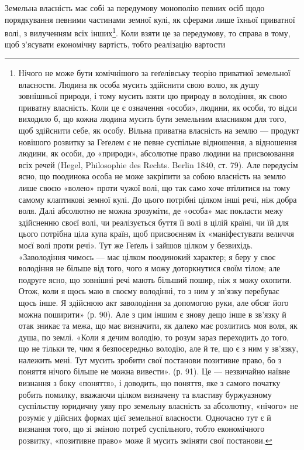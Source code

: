 Земельна власність має собі за передумову монополію певних осіб щодо
порядкування певними частинами земної кулі, як сферами лише їхньої приватної
волі, з вилученням всіх інших\footnote{
Нічого не може бути комічнішого за геґелівську теорію приватної земельної власности. Людина
як особа мусить здійснити свою волю, як душу зовнішньої природи, і тому мусить взяти цю
природу в володіння, як свою приватну власність. Коли це є означення «особи», людини, як особи,
то відси виходило б, що кожна людина мусить бути земельним власником для того, щоб здійснити себе,
як особу. Вільна приватна власність на землю — продукт новішого розвитку за Геґелем є не певне
суспільне відношення, а відношення людини, як особи, до «природи», абсолютне право людини на
присвоювання
всіх речей (Hegel, Philosophie des Rechts. Berlin 1840, ст. 79). Але передусім ясно, що поодинока
особа не може закріпити за собою власність на землю лише своєю «волею» проти чужої волі, що
так само хоче втілитися на тому самому клаптикові земної кулі. До цього потрібні цілком інші речі,
ніж добра воля. Далі абсолютно не можна зрозуміти, де «особа» має покласти межу здійсненню своєї
волі, чи реалізується буття її волі в цілій країні, чи їй для цього потрібна ціла купа країн, щоб
присвоєнням
їх «маніфестувати величчя моєї волі проти речі». Тут же Геґель і зайшов цілком у безвихідь.
«Заволодіння чимось — має цілком поодинокий характер; я беру у своє володіння не більше від того,
чого
я можу доторкнутися своїм тілом; але подруге ясно, що зовнішні речі мають більший пошир, ніж
я можу охопити. Отож, коли я щось маю в своєму володінні, то з ним у зв’язку перебуває щось інше.
Я здійснюю акт заволодіння за допомогою руки, але обсяг його можна поширити» (р. 90). Але з цим
іншим є знову дещо інше в зв’язку й отак зникає та межа, що має визначити, як далеко має розлитись
моя воля, як душа, по землі. «Коли я дечим володію, то розум зараз переходить до того, що не
тільки те, чим я безпосередньо володію, але й те, що є з ним у зв'язку, належить мені. Тут мусить
зробити свої постанови позитивне право, бо з поняття нічого більше не можна вивести». (р. 91). Це —
незвичайно наївне визнання з боку «поняття», і доводить, що поняття, яке з самого початку робить
помилку, вважаючи цілком визначену та властиву буржуазному суспільству юридичну уяву про земельну
власність за абсолютну, «нічого» не розуміє у дійсних формах цієї земельної власности. Одночасно тут
є й визнання того, що зі зміною потреб суспільного, тобто економічного розвитку, «позитивне право»
може й мусить зміняти свої постанови.
}. Коли взяти це за передумову, то
справа в тому, щоб з’ясувати економічну вартість, тобто реалізацію вартости
